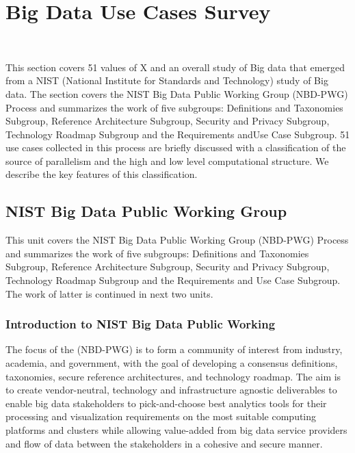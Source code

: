 

\chapter{Big Data Use Cases Survey}
\label{s:nist-usecase}

\FILENAME\

This section covers 51 values of X and an overall study of Big data that
emerged from a NIST (National Institute for Standards and Technology)
study of Big data. The section covers the NIST Big Data Public Working
Group (NBD-PWG) Process and summarizes the work of five subgroups:
Definitions and Taxonomies Subgroup, Reference Architecture Subgroup,
Security and Privacy Subgroup, Technology Roadmap Subgroup and the
Requirements andUse Case Subgroup. 51 use cases collected in this
process are briefly discussed with a classification of the source of
parallelism and the high and low level computational structure. We
describe the key features of this classification.

\section{NIST Big Data Public Working Group}

This unit covers the NIST Big Data Public Working Group (NBD-PWG)
Process and summarizes the work of five subgroups: Definitions and
Taxonomies Subgroup, Reference Architecture Subgroup, Security and
Privacy Subgroup, Technology Roadmap Subgroup and the Requirements and
Use Case Subgroup. The work of latter is continued in next two units.




\subsection{Introduction to NIST Big Data Public Working }

The focus of the (NBD-PWG) is to form a community of interest from
industry, academia, and government, with the goal of developing a
consensus definitions, taxonomies, secure reference architectures, and
technology roadmap. The aim is to create vendor-neutral, technology and
infrastructure agnostic deliverables to enable big data stakeholders to
pick-and-choose best analytics tools for their processing and
visualization requirements on the most suitable computing platforms and
clusters while allowing value-added from big data service providers and
flow of data between the stakeholders in a cohesive and secure manner.


